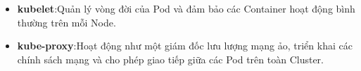 \documentclass[a4paper,12pt]{article}
\begin{document}
\begin{itemize}
    \begin{itemize}
        \item \textbf{kubelet}:Quản lý vòng đời của Pod và đảm bảo các Container hoạt động bình thường trên mỗi Node.
        \item \textbf{kube-proxy}:Hoạt động như một giám đốc lưu lượng mạng ảo, triển khai các chính sách mạng và cho phép
giao tiếp giữa các Pod trên toàn Cluster.
    \end{itemize}
\end{itemize}
\end{document}
